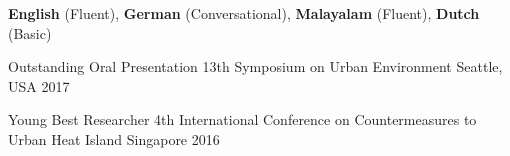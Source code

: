 \documentclass[11pt, a4paper]{awesome-cv}
\begin{document}

\begin{cvskills}
    \cvskill
    {}
    {\textbf{English} (Fluent), \textbf{German} (Conversational), \textbf{Malayalam} (Fluent), \textbf{Dutch} (Basic)}
\end{cvskills}



\begin{cvhonors}

  \cvhonor
    {Outstanding Oral Presentation} %
    {13th Symposium on Urban Environment} %
    {Seattle, USA} %
    {2017} %

    \cvhonor
    {Young Best Researcher} %
    {4th International Conference on Countermeasures to Urban Heat Island} %
    {Singapore} %
    {2016} %
\end{cvhonors}


\end{document}
